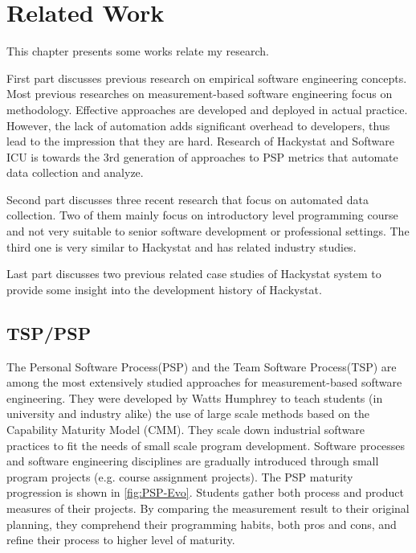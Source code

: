 \chapter{Related Work}
This chapter presents some works relate my research.

First part discusses previous research on empirical software engineering concepts. Most previous researches on measurement-based software engineering focus on methodology. Effective approaches are developed and deployed in actual practice. However, the lack of automation adds significant overhead to developers, thus lead to the impression that they are hard. Research of Hackystat and Software ICU is towards the 3rd generation of approaches to PSP metrics that automate data collection and analyze\cite{csdl2-02-07}.

Second part discusses three recent research that focus on automated data collection. Two of them mainly focus on introductory level programming course and not very suitable to senior software development or professional settings. The third one is very similar to Hackystat and has related industry studies.


Last part discusses two previous related case studies of Hackystat system to provide some insight into the development history of Hackystat.

\section {TSP/PSP}
The Personal Software Process(PSP)\cite{book:psp} and the Team Software Process(TSP)\cite{book:tsp} are among the most extensively studied approaches for measurement-based software engineering. They were developed by Watts Humphrey to teach students (in university and industry alike) the use of large scale methods based on the Capability Maturity Model (CMM). They scale down industrial software practices to fit the needs of small scale program development. Software processes and software engineering disciplines are gradually introduced through small program projects (e.g. course assignment projects). The PSP maturity progression is shown in \autoref{fig:PSP-Evo}. Students gather both process and product measures of their projects. By comparing the measurement result to their original planning, they comprehend their programming habits, both pros and cons, and refine their process to higher level of maturity.

